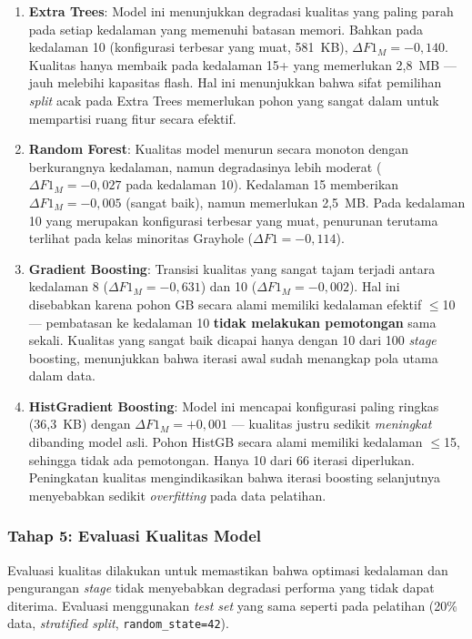 \begin{enumerate}
    \item \textbf{Extra Trees}: Model ini menunjukkan degradasi kualitas yang paling parah pada setiap kedalaman yang memenuhi batasan memori. Bahkan pada kedalaman 10 (konfigurasi terbesar yang muat, 581~KB), $\Delta F1_M = -0{,}140$. Kualitas hanya membaik pada kedalaman 15+ yang memerlukan 2,8~MB --- jauh melebihi kapasitas flash. Hal ini menunjukkan bahwa sifat pemilihan \textit{split} acak pada Extra Trees memerlukan pohon yang sangat dalam untuk mempartisi ruang fitur secara efektif.

    \item \textbf{Random Forest}: Kualitas model menurun secara monoton dengan berkurangnya kedalaman, namun degradasinya lebih moderat ($\Delta F1_M = -0{,}027$ pada kedalaman 10). Kedalaman 15 memberikan $\Delta F1_M = -0{,}005$ (sangat baik), namun memerlukan 2,5~MB. Pada kedalaman 10 yang merupakan konfigurasi terbesar yang muat, penurunan terutama terlihat pada kelas minoritas Grayhole ($\Delta F1 = -0{,}114$).

    \item \textbf{Gradient Boosting}: Transisi kualitas yang sangat tajam terjadi antara kedalaman 8 ($\Delta F1_M = -0{,}631$) dan 10 ($\Delta F1_M = -0{,}002$). Hal ini disebabkan karena pohon GB secara alami memiliki kedalaman efektif $\leq$10 --- pembatasan ke kedalaman 10 \textbf{tidak melakukan pemotongan} sama sekali. Kualitas yang sangat baik dicapai hanya dengan 10 dari 100 \textit{stage} boosting, menunjukkan bahwa iterasi awal sudah menangkap pola utama dalam data.

    \item \textbf{HistGradient Boosting}: Model ini mencapai konfigurasi paling ringkas (36,3~KB) dengan $\Delta F1_M = +0{,}001$ --- kualitas justru sedikit \textit{meningkat} dibanding model asli. Pohon HistGB secara alami memiliki kedalaman $\leq$15, sehingga tidak ada pemotongan. Hanya 10 dari 66 iterasi diperlukan. Peningkatan kualitas mengindikasikan bahwa iterasi boosting selanjutnya menyebabkan sedikit \textit{overfitting} pada data pelatihan.
\end{enumerate}

\subsubsection{Tahap 5: Evaluasi Kualitas Model}
\label{subsec:quality_eval}

Evaluasi kualitas dilakukan untuk memastikan bahwa optimasi kedalaman dan pengurangan \textit{stage} tidak menyebabkan degradasi performa yang tidak dapat diterima. Evaluasi menggunakan \textit{test set} yang sama seperti pada pelatihan (20\% data, \textit{stratified split}, \texttt{random\_state=42}).

